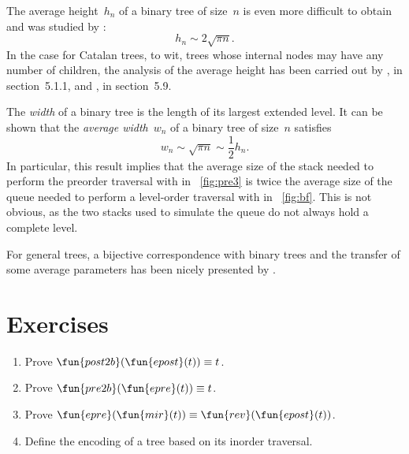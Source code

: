 
The average height~\(h_n\) of a
binary tree of size~\(n\) is even more difficult to obtain and was
studied by
\cite{FlajoletOdlyzko_1981,BrownShubert_1984,FlajoletOdlyzko_1984,Odlyzko_1984}:
\begin{equation*}
h_n \sim 2 \sqrt{\pi n}.
\end{equation*}
In the case for Catalan trees, to wit, trees whose internal nodes may
have any number of children, the analysis of the average height has
been carried out by \cite{DasarathyYang_1980,DershowitzZaks_1981},
\cite{Kemp_1984} in section~5.1.1,
\cite{DershowitzZaks_1990,KnuthdeBruijnRice_2000b} and
\cite{SedgewickFlajolet_1996}, in
section~5.9.


The \emph{width} of a binary tree is the
length of its largest extended level. It can be shown that the \emph{average
  width}~\(w_n\) of a binary tree of
size~\(n\) satisfies
\begin{equation*}
w_n \sim \sqrt{\pi n} \sim \frac{1}{2} h_n.
\end{equation*}
In particular, this result implies that the average size of the stack
needed to perform the preorder traversal with
 in
\fig~\vref{fig:pre3} is twice the average size of the queue needed to
perform a level\hyp{}order traversal with
 in \fig~\vref{fig:bf}. This is not
obvious, as the two stacks used to simulate the queue do not always
hold a complete level.

For general trees, a bijective correspondence with binary trees and
the transfer of some average parameters has been nicely presented by
\cite{DasarathyYang_1980}.

\section*{Exercises}

\begin{enumerate}

  \item Prove \(\fun{post2b}(\fun{epost}(t)) \equiv t\).

  \item Prove \(\fun{pre2b}(\fun{epre}(t)) \equiv t\).

  \item Prove \(\fun{epre}(\fun{mir}(t)) \equiv
    \fun{rev}(\fun{epost}(t))\).

  \item Define the encoding of a tree based on its inorder traversal.

\end{enumerate}

